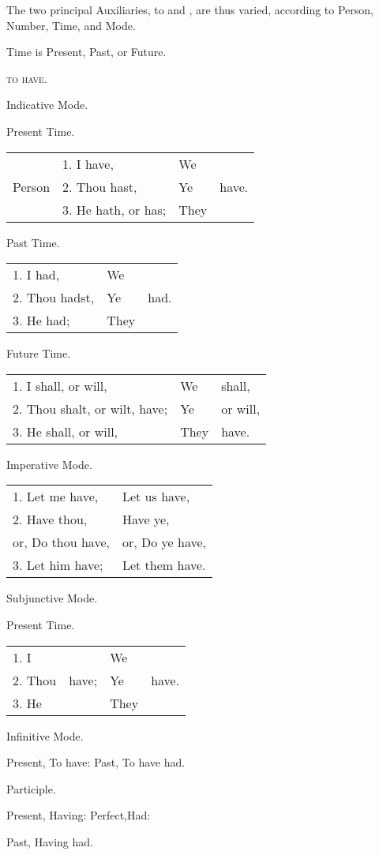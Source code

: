The two principal Auxiliaries, to  and , are thus
varied, according to Person, Number, Time, and Mode.

\begin{center}
  Time is Present, Past, or Future.

  \textsc{to have}.

  Indicative Mode.

  Present Time.

  \begin{tabular}[h]{llll}
    & 1. I have, & We\\
    Person & 2. Thou hast,\footnotemark & Ye & have.\\
    & 3. He hath, or has;\footnotemark & They\\
  \end{tabular}

  Past Time.

  \begin{tabular}[h]{lll}
    1. I had, & We\\
    2. Thou hadst, & Ye & had.\\
    3. He had; & They\\
  \end{tabular}

  Future Time.

  \begin{tabular}[h]{lll}
    1. I shall, or will, & We & shall,\\
    2. Thou shalt, or wilt\footnotemark, have; & Ye & or will,\\
    3. He shall, or will, & They & have.\\
  \end{tabular}

  Imperative Mode.

  \begin{tabular}[h]{ll}
    1. Let me have, & Let us have,\\
    2. Have thou, & Have ye,\\
    or, Do thou have, & or, Do ye have,\\
    3. Let him have; & Let them have.\\
  \end{tabular}

  Subjunctive Mode.

  Present Time.

  \begin{tabular}[h]{llll}
    1. I & & We\\
    2. Thou & have; & Ye & have.\\
    3. He & & They\\
  \end{tabular}

  Infinitive Mode.

  Present, To have: Past, To have had.

  Participle.

  Present, Having: Perfect,\footnotemark Had:

  Past, Having had.
\end{center}

